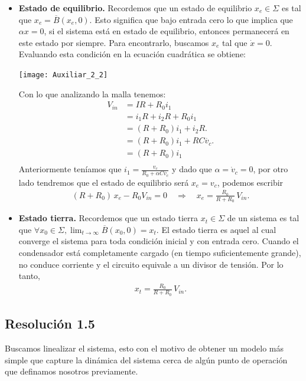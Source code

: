 \documentclass[
  11pt,
  letterpaper,
   addpoints,
   answers
  ]{exam}
\begin{document}
\begin{questions}
\begin{solution}
\begin{itemize}
    \item \textbf{Estado de equilibrio.} Recordemos que un estado de equilibrio \(x_e \in \Sigma\) es tal que \(x_e = \overline{B}(x_e, 0)\). Esto significa que bajo entrada cero lo que implica que \(\alpha x=0\), si el sistema está en estado de equilibrio, entonces permanecerá en este estado por siempre. Para encontrarlo, buscamos \(x_e\) tal que \(\dot x=0\). Evaluando esta condición en la ecuación cuadrática se obtiene:
    \begin{center}
        \texttt{[image: Auxiliar\_2\_2]}
    \end{center}
    Con lo que analizando la malla tenemos:
    \begin{align}
        V_{in} &= IR + R_{0}i_{1}\\
                &= i_{1}R + i_{2}R + R_{0}i_{1}\\
                &= (R + R_0)i_{1} + i_{2}R.\\
                &=(R + R_0)i_{1} + RC\dot{v_{c}}.\\
                &= (R + R_0)i_{1}\\
    \end{align}
    Anteriormente teníamos que $i_{1} = \frac{v_{c}}{R_{0}+\alpha C \dot{v_{c}}}$ y dado que $\alpha=\dot{v}_{c}=0$, por otro lado tendremos que el estado de equilibrio será $x_e = v_c$, podemos escribir
    \begin{align}
    (R+R_0)\,x_e - R_0 V_{in}=0 \quad \Rightarrow \quad
    x_e = \frac{R_0}{R+R_0}\,V_{in}.
    \end{align}
    
    \item \textbf{Estado tierra.} Recordemos que un estado tierra \(x_t \in \Sigma\) de un sistema es tal que \(\forall x_0 \in \Sigma, \lim_{t \to \infty} \overline{B}(x_0, 0) = x_t\). El estado tierra es aquel al cual converge el sistema para toda condición inicial y con entrada cero. Cuando el condensador está completamente cargado (en tiempo suficientemente grande), no conduce corriente y el circuito equivale a un divisor de tensión. Por lo tanto,
    \begin{align}
    x_t = \frac{R_0}{R+R_0}\,V_{in}.
    \end{align}
\end{itemize}

\subsection*{Resolución 1.5}
Buscamos linealizar el sistema, esto con el motivo de obtener un modelo más simple que capture la dinámica del sistema cerca de algún punto de operación que definamos nosotros previamente. 


\end{solution}
\end{questions}
\end{document}
